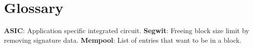 \documentclass[12pt, letterpaper]{article}
\begin{document}
\section{Glossary}

\textbf{ASIC}: Application specific integrated circuit. \newline{}
\textbf{Segwit}: Freeing block size limit by removing signature data. \newline{}
\textbf{Mempool}: List of entries that want to be in a block. \newline{}
\end{document}
